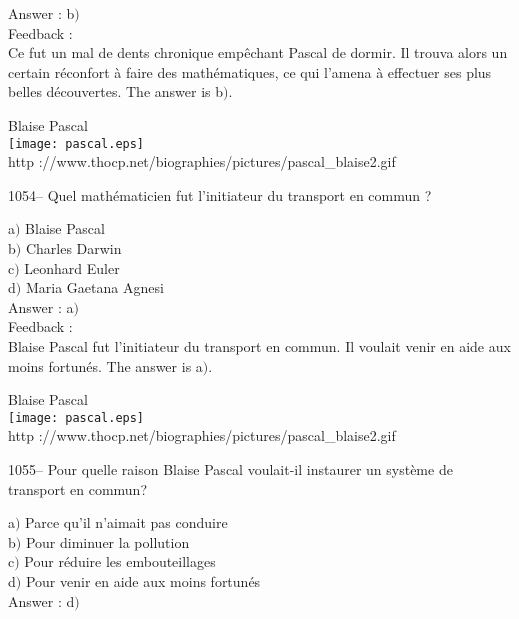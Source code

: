 ﻿\documentclass[letterpaper, 12pt]{article}
\begin{document}
Answer : b$)$\\

Feedback : \\
Ce fut un mal de dents chronique emp\^echant Pascal de dormir. Il
trouva alors un certain r\'econfort \`a faire des math\'ematiques,
ce qui l'amena \`a effectuer ses plus belles d\'ecouvertes.
The answer is b$)$.\\

        \begin{center}
        Blaise Pascal\\
    \texttt{[image: pascal.eps]}\\
        {\footnotesize http
://www.thocp.net/biographies/pictures/pascal\_blaise2.gif}
    \end{center}

1054-- Quel math\'ematicien fut l'initiateur du transport en commun
?

a$)$ Blaise Pascal \\
b$)$ Charles Darwin  \\
c$)$ Leonhard Euler  \\
d$)$ Maria Gaetana Agnesi\\

Answer : a$)$\\

Feedback : \\
Blaise Pascal fut l'initiateur du transport en commun. Il voulait
venir en aide aux moins fortun\'es.
The answer is a$)$.\\

        \begin{center}
        Blaise Pascal\\
    \texttt{[image: pascal.eps]}\\
        {\footnotesize http
://www.thocp.net/biographies/pictures/pascal\_blaise2.gif}
    \end{center}

1055-- Pour quelle raison Blaise Pascal voulait-il instaurer un
syst\`eme de transport en commun?

a$)$ Parce qu'il n'aimait pas conduire \\
b$)$ Pour diminuer la pollution \\
c$)$ Pour r\'eduire les embouteillages  \\
d$)$ Pour venir en aide aux moins fortun\'es \\

Answer : d$)$\\
\end{document}
